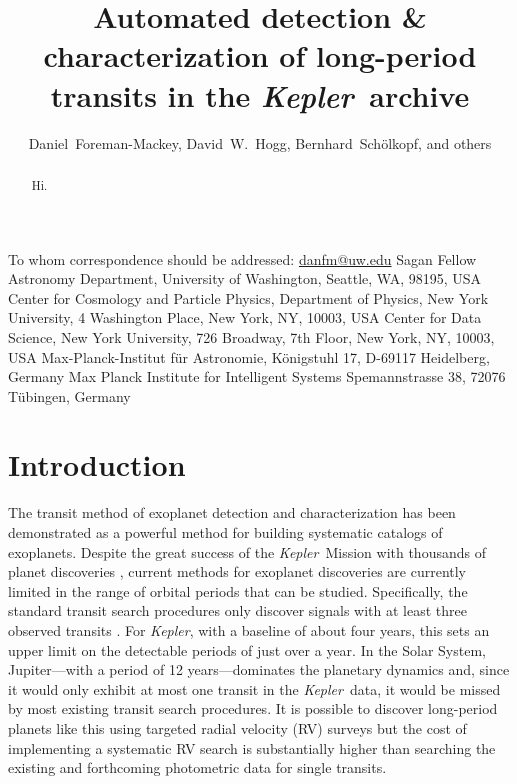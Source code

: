 \documentclass[12pt,preprint]{aastex}
\newcommand{\project}[1]{\textsl{#1}}
\newcommand{\kepler}{\project{Kepler}}
\begin{document}
\title{%
Automated detection \& characterization of long-period transits in the
\kepler\ archive
}

\newcommand{\uw}{3}
\newcommand{\nyu}{4}
\newcommand{\cds}{5}
\newcommand{\mpia}{6}
\newcommand{\mpis}{7}
\author{%
    Daniel~Foreman-Mackey\altaffilmark{1,2,\uw},
    David~W.~Hogg\altaffilmark{\nyu,\mpia,\cds},
    Bernhard~Sch\"olkopf\altaffilmark{\mpis},
    and others
}
         {To whom correspondence should be addressed:
                          \url{danfm@uw.edu}}
         {Sagan Fellow}
\altaffiltext{\uw}       {Astronomy Department, University of Washington,
                          Seattle, WA, 98195, USA}
\altaffiltext{\nyu}      {Center for Cosmology and Particle Physics,
                          Department of Physics, New York University,
                          4 Washington Place, New York, NY, 10003, USA}
\altaffiltext{\cds}      {Center for Data Science, New York University,
                          726 Broadway, 7th Floor, New York, NY, 10003, USA}
\altaffiltext{\mpia}     {Max-Planck-Institut f\"ur Astronomie,
                          K\"onigstuhl 17, D-69117 Heidelberg, Germany}
\altaffiltext{\mpis}     {Max Planck Institute for Intelligent Systems
                          Spemannstrasse 38, 72076 T\"ubingen, Germany}

\begin{abstract}

Hi.

\end{abstract}


\section{Introduction}

The transit method of exoplanet detection and characterization has been
demonstrated as a powerful method for building systematic catalogs of
exoplanets.
Despite the great success of the \kepler\ Mission with thousands of planet
discoveries \citep{Burke:2014, Rowe:2015}, current methods for exoplanet
discoveries are currently limited in the range of orbital periods that can be
studied.
Specifically, the standard transit search procedures only discover signals
with at least three observed transits \citep[for example][]{Petigura:2013,
Burke:2014, Rowe:2015}.
For \kepler, with a baseline of about four years, this sets an upper limit on
the detectable periods of just over a year.
In the Solar System, Jupiter---with a period of 12 years---dominates the
planetary dynamics and, since it would only exhibit at most one transit in the
\kepler\ data, it would be missed by most existing transit search procedures.
It is possible to discover long-period planets like this using targeted radial
velocity (RV) surveys \citep[for example][]{Butler:2006, Knutson:2014} but the
cost of implementing a systematic RV search is substantially higher than
searching the existing and forthcoming photometric data for single transits.
\end{document}

